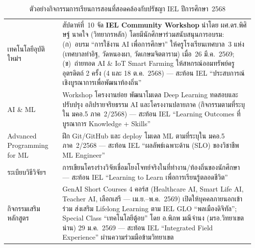 \begin{table}[H]
  \centering
  \caption{ตัวอย่างกิจกรรมการเรียนการสอนที่สอดคล้องกับปรัชญา IEL ปีการศึกษา~2568}
  \label{tbl:iel_course_activity}
  \begingroup
  \footnotesize
  \setlength{\tabcolsep}{4pt}
  \renewcommand{\arraystretch}{1.35}
  \begin{tabularx}{\linewidth}{|>{\raggedright\arraybackslash}p{3.2cm}|>{\raggedright\arraybackslash}X|}
    \hline
    \rowcolor{olive!60!black}
    \multicolumn{1}{|c|}{\textcolor{white}{\textbf{รายวิชา}}} & \multicolumn{1}{c|}{\textcolor{white}{\textbf{กิจกรรมการเรียนการสอนที่สอดคล้องกับปรัชญาการศึกษา (IEL)}}} \\
    \hline
    7015101 เทคโนโลยีอุบัติใหม่ฯ &
    สัปดาห์ที่~10 จัด \textbf{IEL Community Workshop} นำโดย ผศ.ดร.พิศิษฐ์ นาคใจ (วิทยากรหลัก) โดยมีนักศึกษาร่วมสนับสนุนการอบรม: (ก)~อบรม ``การใช้งาน AI เพื่อการศึกษา'' ให้ครูโรงเรียนเทศบาล~3 แห่ง (เทศบาลท่าอิฐ, วัดหนองผา, วัดเกษมจิตตาราม) เมื่อ~26 มี.ค.~2569; (ข)~ถ่ายทอด AI \& IoT Smart Farming ให้สหกรณ์ออมทรัพย์ครูอุตรดิตถ์ 2 ครั้ง (4 และ 18 ต.ค.~2568) --- สะท้อน IEL ``ประสบการณ์เชิงบูรณาการเพื่อพัฒนาท้องถิ่น'' \\
    \hline
    4095101 AI \& ML &
    Workshop โครงงานย่อย พัฒนาโมเดล Deep Learning ทดสอบและปรับปรุง อภิปรายจริยธรรม AI และโครงงานปลายภาค (กิจกรรมตามที่ระบุใน มคอ.5 ภาค~2/2568) --- สะท้อน IEL ``Learning Outcomes ที่บูรณาการ Knowledge + Skills'' \\
    \hline
    4095102 Advanced Programming for ML &
    ฝึก Git/GitHub และ deploy โมเดล ML ตามที่ระบุใน มคอ.5 ภาค~2/2568 --- สะท้อน IEL ``ผลลัพธ์เฉพาะด้าน (SLO) ของวิชาชีพ ML Engineer'' \\
    \hline
    7015906 ระเบียบวิธีวิจัยฯ &
    การเขียนโครงร่างวิจัยเชื่อมโยงโจทย์จริงในที่ทำงาน/ท้องถิ่นของนักศึกษา --- สะท้อน IEL ``Learning to Learn เพื่อการเรียนรู้ตลอดชีวิต'' \\
    \hline
    กิจกรรมเสริมหลักสูตร &
    GenAI Short Courses 4 คอร์ส (Healthcare AI, Smart Life AI, Teacher AI, เลือกเสรี --- เม.ย.--พ.ค.~2569) เปิดให้บุคคลภายนอกเข้าร่วม ส่งเสริม Lifelong Learning ตาม IEL GLO ``พลเมืองดิจิทัล''; Special Class ``เทคโนโลยีตู้อบ'' โดย อ.พิภพ มณีจำนง (มรอ.วิทยาเขตน่าน) 29 ม.ค.~2569 --- สะท้อน IEL ``Integrated Field Experience'' ผ่านความร่วมมือข้ามวิทยาเขต \\
    \hline
  \end{tabularx}
  \endgroup
\end{table}


